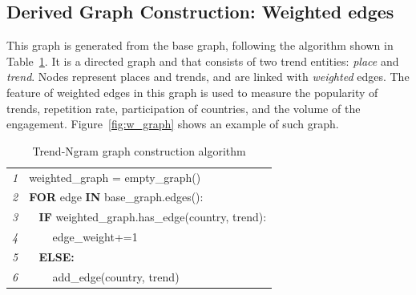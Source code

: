 \documentclass[utf8]{frontiersSCNS} %
\begin{document}
\subsection{Derived Graph Construction: Weighted edges}

This graph is generated from the base graph, following the algorithm shown in Table~\ref{tbl:algorithm1}. It is a directed graph and that consists of two trend entities: {\emph{place}} and {\emph{trend}}. Nodes represent places and trends, and are linked with {\emph{weighted}} edges. The feature of weighted edges in this graph is used to measure the popularity of trends, repetition rate, participation of countries, and the volume of the engagement. Figure~\ref{fig:w_graph} shows an example of such graph.


\begin{table}
\centering
\begin{tabular}{l|l}
\hline
{\emph{1}} & weighted\_graph = empty\_graph()\\
{\emph{2}} & \textbf{FOR} edge \textbf{IN} base\_graph.edges():\\
{\emph{3}} &  $\>\>\>\>$\textbf{IF} weighted\_graph.has\_edge(country, trend):\\
{\emph{4}} &  $\>\>\>\>\>\>\>\>$ edge\_weight+=1\\
{\emph{5}} &  $\>\>\>\>$\textbf{ELSE:}\\
{\emph{6}} &  $\>\>\>\>\>\>\>\>$ add\_edge(country, trend)\\
\hline
\end{tabular}
\caption{Trend-Ngram graph construction algorithm}
\label{tbl:algorithm1}
\end{table}


\end{document}
